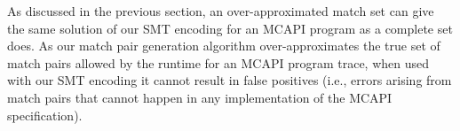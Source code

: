 As discussed in the previous section, an over-approximated match set can give the same solution of our SMT encoding for an MCAPI program as a complete set does. As our match pair generation algorithm over-approximates the true set of match pairs allowed by the runtime for an MCAPI program trace, when used with our SMT encoding it cannot result in false positives (i.e.,  errors arising from match pairs that cannot happen in any implementation of the MCAPI specification). %
